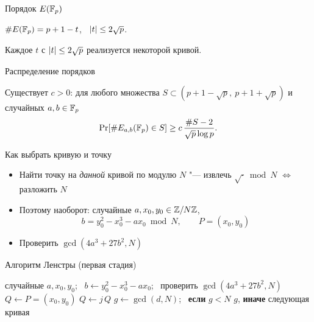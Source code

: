 \documentclass{ca-slides}
\begin{document}
\begin{canvasframe}{Порядок $E(\mathbb{F}_p)$}
  \begin{theorem}[Хассе]
    $\#E(\mathbb{F}_p) = p + 1 - t$, \ $\lvert t\rvert \le 2\sqrt p$.
  \end{theorem}
  \begin{theorem}[Дойринг]
    Каждое $t$ с $\lvert t\rvert \le 2\sqrt p$ реализуется некоторой кривой.
  \end{theorem}
  \centering
\end{canvasframe}

\begin{canvasframe}{Распределение порядков}
  \begin{theorem}[Ленстра]
    Существует $c > 0$: для любого множества $S \subset (p + 1 - \sqrt p,\ p + 1 + \sqrt p)$
    и случайных $a, b \in \mathbb{F}_p$
    \[\Pr[\#E_{a,b}(\mathbb{F}_p) \in S] \ge c\,\frac{\#S - 2}{\sqrt p \log p}.\]
  \end{theorem}
  \penspace[0.04\textheight]
\end{canvasframe}

\begin{canvasframe}{Как выбрать кривую и точку}
  \begin{itemize}
    \item Найти точку на \emph{данной} кривой по модулю $N$ "--- извлечь $\sqrt{\cdot} \bmod N$
      $\Leftrightarrow$ разложить $N$
    \item Поэтому наоборот: случайные $a, x_0, y_0 \in \mathbb{Z}/N\mathbb{Z}$,
      \[b = y_0^2 - x_0^3 - a x_0 \bmod N, \qquad P = (x_0, y_0)\]
    \item Проверить $\gcd(4a^3 + 27b^2, N)$
  \end{itemize}
\end{canvasframe}

\begin{canvasframe}[shrink=8]{Алгоритм Ленстры (первая стадия)}
  \begin{algorithmic}[1]
      \State случайные $a, x_0, y_0$; \ $b \gets y_0^2 - x_0^3 - a x_0$; \ проверить
        $\gcd(4a^3 + 27b^2, N)$
      \State $Q \gets P = (x_0, y_0)$
        \State $Q \gets j\,Q$ 
          \State $g \gets \gcd(d, N)$; \ \textbf{если} $g < N$ \Return $g$, \textbf{иначе}
            следующая кривая
        \EndIf
      \EndFor
    \EndFor
  \end{algorithmic}
\end{canvasframe}
\end{document}
